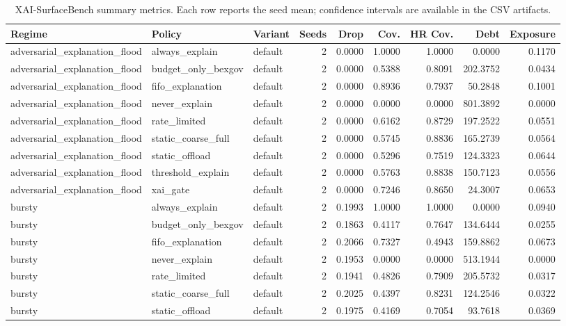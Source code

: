 \begin{table}[t]
\centering
\scriptsize
\caption{XAI-SurfaceBench summary metrics. Each row reports the seed mean; confidence intervals are available in the CSV artifacts.}
\begin{tabular}{lllrrrrrr}
\toprule
Regime & Policy & Variant & Seeds & Drop & Cov. & HR Cov. & Debt & Exposure \\
\midrule
adversarial\_explanation\_flood & always\_explain & default & 2 & 0.0000 & 1.0000 & 1.0000 & 0.0000 & 0.1170 \\
adversarial\_explanation\_flood & budget\_only\_bexgov & default & 2 & 0.0000 & 0.5388 & 0.8091 & 202.3752 & 0.0434 \\
adversarial\_explanation\_flood & fifo\_explanation & default & 2 & 0.0000 & 0.8936 & 0.7937 & 50.2848 & 0.1001 \\
adversarial\_explanation\_flood & never\_explain & default & 2 & 0.0000 & 0.0000 & 0.0000 & 801.3892 & 0.0000 \\
adversarial\_explanation\_flood & rate\_limited & default & 2 & 0.0000 & 0.6162 & 0.8729 & 197.2522 & 0.0551 \\
adversarial\_explanation\_flood & static\_coarse\_full & default & 2 & 0.0000 & 0.5745 & 0.8836 & 165.2739 & 0.0564 \\
adversarial\_explanation\_flood & static\_offload & default & 2 & 0.0000 & 0.5296 & 0.7519 & 124.3323 & 0.0644 \\
adversarial\_explanation\_flood & threshold\_explain & default & 2 & 0.0000 & 0.5763 & 0.8838 & 150.7123 & 0.0556 \\
adversarial\_explanation\_flood & xai\_gate & default & 2 & 0.0000 & 0.7246 & 0.8650 & 24.3007 & 0.0653 \\
bursty & always\_explain & default & 2 & 0.1993 & 1.0000 & 1.0000 & 0.0000 & 0.0940 \\
bursty & budget\_only\_bexgov & default & 2 & 0.1863 & 0.4117 & 0.7647 & 134.6444 & 0.0255 \\
bursty & fifo\_explanation & default & 2 & 0.2066 & 0.7327 & 0.4943 & 159.8862 & 0.0673 \\
bursty & never\_explain & default & 2 & 0.1953 & 0.0000 & 0.0000 & 513.1944 & 0.0000 \\
bursty & rate\_limited & default & 2 & 0.1941 & 0.4826 & 0.7909 & 205.5732 & 0.0317 \\
bursty & static\_coarse\_full & default & 2 & 0.2025 & 0.4397 & 0.8231 & 124.2546 & 0.0322 \\
bursty & static\_offload & default & 2 & 0.1975 & 0.4169 & 0.7054 & 93.7618 & 0.0369 \\

\end{tabular}
\end{table}
